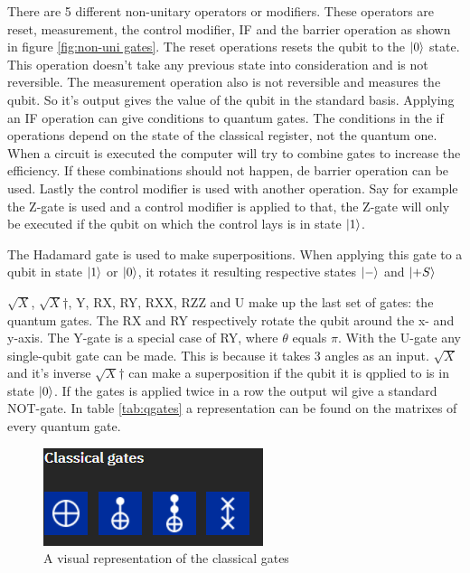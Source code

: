 There are 5 different non-unitary operators or modifiers. These operators are reset, measurement, the control modifier, IF and the barrier operation as shown in figure \ref{fig:non-uni gates}.
The reset operations resets the qubit to the $\ket{0}$ state. This operation doesn't take any previous state into consideration and is not reversible.
The measurement operation also is not reversible and measures the qubit. So it's output gives the value of the qubit in the standard basis.
Applying an IF operation can give conditions to quantum gates. The conditions in the if operations depend on the state of the classical register, not the quantum one.
When a circuit is executed the computer will try to combine gates to increase the efficiency. If these combinations should not happen, de barrier operation can be used.
Lastly the control modifier is used with another operation. Say for example the Z-gate is used and a control modifier is applied to that, the Z-gate will only be executed if the qubit on which the control lays is in state $\ket{1}$.

The Hadamard gate is used to make superpositions. When applying this gate to a qubit in state $\ket{1}$ or $\ket{0}$, it rotates it resulting respective states $\ket{-}$ and $\ket{+S}$

$\sqrt{X}$, $\sqrt{X}$$\dagger$, Y, RX, RY, RXX, RZZ and U make up the last set of gates: the quantum gates. 
The RX and RY respectively rotate the qubit around the x- and y-axis. The Y-gate is a special case of RY, where $\theta$ equals $\pi$.
With the U-gate any single-qubit gate can be made. This is because it takes 3 angles as an input.
$\sqrt{X}$ and it's inverse $\sqrt{X}$$\dagger$ can make a superposition if the qubit it is qpplied to is in state $\ket{0}$. If the gates is applied twice in a row the output wil give a standard NOT-gate.
In table \ref{tab:qgates} a representation can be found on the matrixes of every quantum gate.

\begin{figure} [h]
    \centering
    \includegraphics[width=\textwidth]{img/classical-gates.PNG}
        \caption{A visual representation of the classical gates}
        \label{fig:classical gates}
\end{figure}

